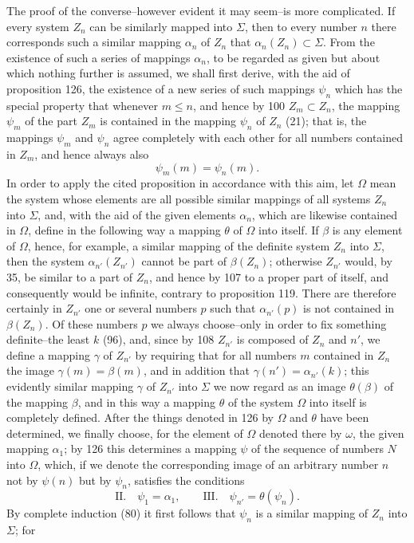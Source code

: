\documentclass[11pt]{article}
\newcommand{\partof}{\mathrel{\subset}}
\begin{document}
The proof of the converse--however evident it may seem--is more complicated. If every system $Z_n$ can be similarly mapped into $\Sigma$, then to every number $n$ there corresponds such a similar mapping $\alpha_n$ of $Z_n$ that $\alpha_n(Z_n)\partof\Sigma$. From the existence of such a series of mappings $\alpha_n$, to be regarded as given but about which nothing further is assumed, we shall first derive, with the aid of proposition 126, the existence of a new series of such mappings $\psi_n$ which has the special property that whenever $m\leq n$, and hence by 100 $Z_m\partof Z_n$, the mapping $\psi_m$ of the part $Z_m$ is contained in the mapping $\psi_n$ of $Z_n$ (21); that is, the mappings $\psi_m$ and $\psi_n$ agree completely with each other for all numbers contained in $Z_m$, and hence always also
\[
\psi_m(m)=\psi_n(m).
\]
In order to apply the cited proposition in accordance with this aim, let $\Omega$ mean the system whose elements are all possible similar mappings of all systems $Z_n$ into $\Sigma$, and, with the aid of the given elements $\alpha_n$, which are likewise contained in $\Omega$, define in the following way a mapping $\theta$ of $\Omega$ into itself. If $\beta$ is any element of $\Omega$, hence, for example, a similar mapping of the definite system $Z_n$ into $\Sigma$, then the system $\alpha_{n'}(Z_{n'})$ cannot be part of $\beta(Z_n)$; otherwise $Z_{n'}$ would, by 35, be similar to a part of $Z_n$, and hence by 107 to a proper part of itself, and consequently would be infinite, contrary to proposition 119. There are therefore certainly in $Z_{n'}$ one or several numbers $p$ such that $\alpha_{n'}(p)$ is not contained in $\beta(Z_n)$. Of these numbers $p$ we always choose--only in order to fix something definite--the least $k$ (96), and, since by 108 $Z_{n'}$ is composed of $Z_n$ and $n'$, we define a mapping $\gamma$ of $Z_{n'}$ by requiring that for all numbers $m$ contained in $Z_n$ the image $\gamma(m)=\beta(m)$, and in addition that $\gamma(n')=\alpha_{n'}(k)$; this evidently similar mapping $\gamma$ of $Z_{n'}$ into $\Sigma$ we now regard as an image $\theta(\beta)$ of the mapping $\beta$, and in this way a mapping $\theta$ of the system $\Omega$ into itself is completely defined. After the things denoted in 126 by $\Omega$ and $\theta$ have been determined, we finally choose, for the element of $\Omega$ denoted there by $\omega$, the given mapping $\alpha_1$; by 126 this determines a mapping $\psi$ of the sequence of numbers $N$ into $\Omega$, which, if we denote the corresponding image of an arbitrary number $n$ not by $\psi(n)$ but by $\psi_n$, satisfies the conditions
\[
\text{II.}\quad \psi_1=\alpha_1,
\qquad
\text{III.}\quad \psi_{n'}=\theta(\psi_n).
\]
By complete induction (80) it first follows that $\psi_n$ is a similar mapping of $Z_n$ into $\Sigma$; for
\end{document}
